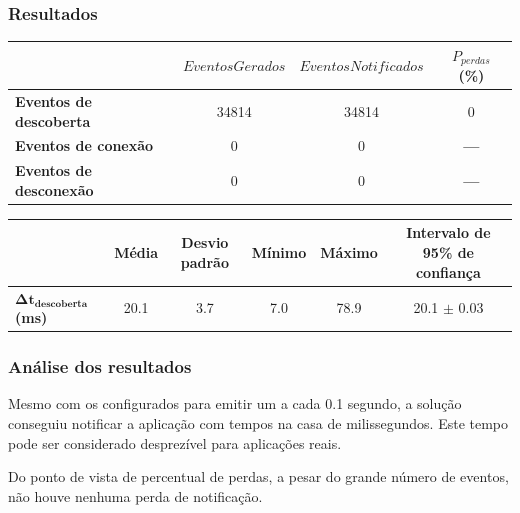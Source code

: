 \documentclass[aspectratio=169]{beamer}
\begin{document}
\begin{frame}
	\frametitle{Resultados}
	\newcommand{\nullval}{\textbf{---}}

	\begin{table}[htb]
		\begin{center}
			\begin{tabular}{lccc}
				\toprule
							       & $EventosGerados$ & $EventosNotificados$ & $P_{perdas}$ (\%) \\
				\midrule
				\textbf{Eventos de descoberta} & 34814            & 34814                & 0		     \\
				\textbf{Eventos de conexão}    & 0                & 0                    & \nullval	     \\
				\textbf{Eventos de desconexão} & 0                & 0                    & \nullval          \\
				\bottomrule
			\end{tabular}
		\end{center}
	\end{table}

	\bigskip

	\begin{table}[htb]
		\centering
		\begin{adjustbox}{max width=\textwidth}
			\begin{tabular}{lccccc}
				\toprule
									   & Média & Desvio padrão & Mínimo & Máximo & Intervalo de 95\% de confiança \\
				\midrule
				$\bm{\Delta t_{descoberta}}$ \textbf{(ms)} & 20.1  & 3.7           & 7.0 & 78.9 & 20.1 $\pm$ 0.03 	              \\
				\bottomrule
			\end{tabular}
		\end{adjustbox}
	\end{table}

\end{frame}

\begin{frame}
	\frametitle{Análise dos resultados}
	Mesmo com os \beacons configurados para emitir um \broadcast a cada 0.1 segundo, a solução conseguiu notificar a aplicação com tempos na casa de milissegundos. Este tempo pode ser considerado desprezível para aplicações reais.

	\bigskip

	Do ponto de vista de percentual de perdas, a pesar do grande número de eventos, não houve nenhuma perda de notificação.
\end{frame}
\end{document}

